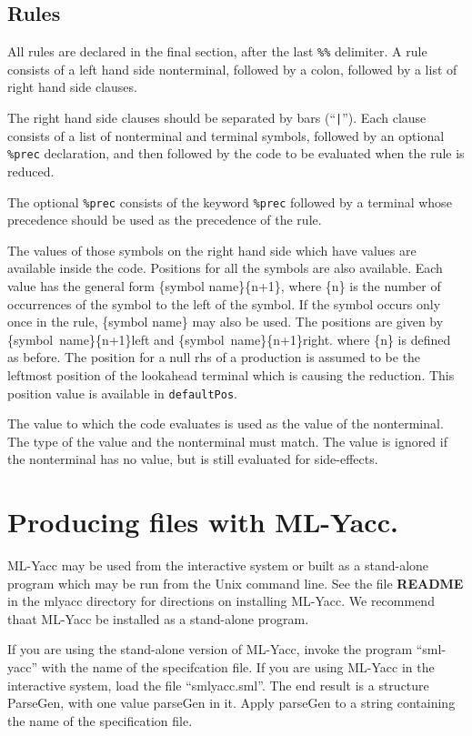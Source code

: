 \subsection{Rules}

All rules are declared in the final section, after the last {\tt \%\%}
delimiter.  A rule consists of a left hand side nonterminal, followed by
a colon, followed by a list of right hand side clauses. 

The right hand side clauses should be separated by bars (``{\tt |}'').  Each
clause consists of a list of nonterminal and terminal symbols, followed
by an optional {\tt \%prec} declaration, and then followed by the code to be
evaluated when the rule is reduced.

The optional {\tt \%prec} consists of the keyword {\tt \%prec} followed by a 
terminal whose precedence should be used as the precedence of the
rule.

The values of those symbols on the right hand side which have values are 
available inside the code.  Positions for all the symbols are also
available.
Each value has the general form \{symbol name\}\{n+1\}, where \{n\} is the 
number of occurrences of the symbol to the left of the symbol.  If
the symbol occurs only once in the rule, \{symbol name\} may also 
be used.
The positions are given by \{symbol~name\}\{n+1\}left and
\{symbol~name\}\{n+1\}right.  where \{n\} is defined as before.
The position for a null rhs of
a production is assumed to be the leftmost position of the lookahead
terminal which is causing the reduction. This position value is
available in {\tt defaultPos}.

The value to which the code evaluates is used as the value of the
nonterminal.  The type of the value and the nonterminal must match.
The value is ignored if the nonterminal has no value, but is still
evaluated for side-effects.

\section{Producing files with ML-Yacc.}

ML-Yacc may be used from the interactive system or built as a
stand-alone program which may be run from the Unix command line.
See the file {\bf README} in the mlyacc directory for directions
on installing ML-Yacc.  We recommend thaat ML-Yacc be installed as
a stand-alone program.

If you are using the stand-alone version of ML-Yacc, invoke the
program ``sml-yacc'' with the name of the specifcation file.
If you are using  ML-Yacc in the interactive system, load the file
``smlyacc.sml''.  The end result is a structure ParseGen, with one
value parseGen in it.  Apply parseGen to a string containing the
name of the specification file.

